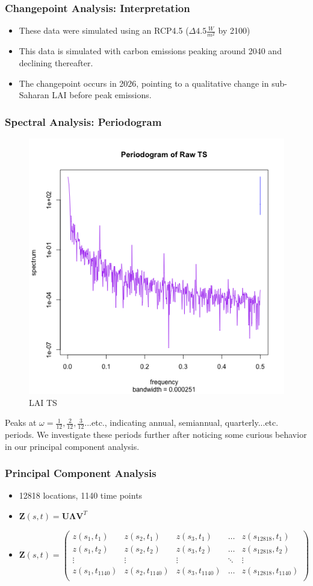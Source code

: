 \documentclass{beamer}
\begin{document}
\begin{frame}
	\frametitle{Changepoint Analysis: Interpretation}
	\begin{itemize}
            \item These data were simulated using an RCP4.5
                ($\Delta 4.5 \frac{W}{m^2}$ by 2100)
		\item This data is simulated with carbon emissions peaking
                    around 2040 and declining thereafter.
                \item The changepoint occurs in 2026, pointing to a qualitative
                    change in sub-Saharan LAI before peak emissions.
	\end{itemize}
\end{frame}


\begin{frame}
	\frametitle{Spectral Analysis: Periodogram}
	\begin{figure}
		\centering
		\includegraphics[width=0.5\linewidth]{../img/RawSpec_LAI.png}
		\caption{LAI TS}
	\end{figure}
	Peaks at $\omega=\frac{1}{12},\frac{2}{12}, \frac{3}{12}...$etc., indicating annual, semiannual, quarterly...etc. periods. We investigate these periods further after noticing some curious behavior in our principal component analysis.
\end{frame}

\begin{frame}
\frametitle{Principal Component Analysis}
\begin{itemize}
	\item 12818 locations, 1140 time points
	\item $\mathbf{Z}(s,t) = \mathbf{U}\mathbf{\Lambda}\mathbf{V}^T$  
	\item $\mathbf{Z}(s,t)  = \begin{pmatrix}
	z(s_1, t_1) & z(s_2, t_1) & z(s_3, t_1) & \dots & z(s_{12818}, t_1) \\
	z(s_1, t_2) & z(s_2, t_2) & z(s_3, t_2) & \dots & z(s_{12818}, t_2) \\
	\vdots & \vdots & \vdots & \ddots & \vdots\\
	z(s_1, t_{1140}) & z(s_2, t_{1140}) & z(s_3, t_{1140}) & \dots & z(s_{12818}, t_{1140})\\ 
	\end{pmatrix}$
\end{itemize}
\end{frame}
\end{document}
